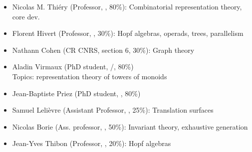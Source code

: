 \begin{itemize}
\item Nicolas M. Thiéry (Professor, \CS, 80\%): Combinatorial
  representation theory, core dev.
\item Florent Hivert (Professor, \CS, 30\%): Hopf algebras, operads,
  trees, parallelism%
\item Nathann Cohen (CR CNRS, section 6, 30\%): Graph theory%
\item Aladin Virmaux (PhD student, \MATH/\CS, 80\%)\\
  Topics: representation theory of towers of monoids
\item Jean-Baptiste Priez (PhD student, \CS, 80\%)
\item Samuel Lelièvre (Assistant Professor, \MATH, 25\%): %
  Translation surfaces%




\item Nicolas Borie (Ass. professor, \CS, 50\%): Invariant theory,
  exhaustive generation%
\item Jean-Yves Thibon (Professor, \CS, 20\%):
  Hopf algebras


\end{itemize}
